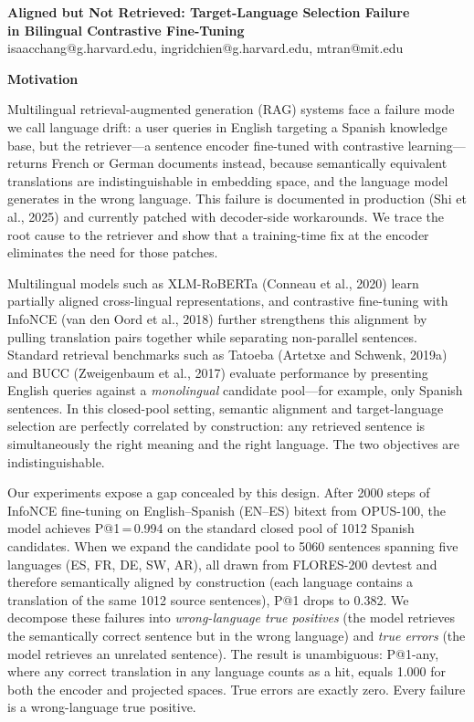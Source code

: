 \documentclass[11pt]{article}
\begin{document}
\begin{center}
{\large \textbf{Aligned but Not Retrieved: Target-Language Selection Failure\\
in Bilingual Contrastive Fine-Tuning}}\\[4pt]
isaacchang@g.harvard.edu, ingridchien@g.harvard.edu, mtran@mit.edu
\end{center}

\vspace{4pt}

\textbf{Motivation}

Multilingual retrieval-augmented generation (RAG) systems face a failure mode we call
language drift: a user queries in English targeting a Spanish knowledge base, but the
retriever---a sentence encoder fine-tuned with contrastive learning---returns French or
German documents instead, because semantically equivalent translations are
indistinguishable in embedding space, and the language model generates in the wrong
language. This failure is documented in production (Shi et al., 2025) and currently
patched with decoder-side workarounds. We trace the root cause to the retriever and
show that a training-time fix at the encoder eliminates the need for those patches.

Multilingual models such as XLM-RoBERTa (Conneau et al., 2020) learn partially aligned
cross-lingual representations, and contrastive fine-tuning with InfoNCE (van den Oord et al.,
2018) further strengthens this alignment by pulling translation pairs together while
separating non-parallel sentences. Standard retrieval benchmarks such as Tatoeba (Artetxe
and Schwenk, 2019a) and BUCC (Zweigenbaum et al., 2017) evaluate performance by presenting
English queries against a \emph{monolingual} candidate pool---for example, only Spanish
sentences. In this closed-pool setting, semantic alignment and target-language selection
are perfectly correlated by construction: any retrieved sentence is simultaneously the
right meaning and the right language. The two objectives are indistinguishable.

Our experiments expose a gap concealed by this design. After 2000 steps of InfoNCE
fine-tuning on English--Spanish (EN--ES) bitext from OPUS-100, the model achieves
P@1\,=\,0.994 on the standard closed pool of 1012 Spanish candidates. When we expand the
candidate pool to 5060 sentences spanning five languages (ES, FR, DE, SW, AR), all drawn
from FLORES-200 devtest and therefore semantically aligned by construction (each language
contains a translation of the same 1012 source sentences), P@1 drops to 0.382. We
decompose these failures into \emph{wrong-language true positives} (the model retrieves
the semantically correct sentence but in the wrong language) and \emph{true errors}
(the model retrieves an unrelated sentence). The result is unambiguous: P@1-any, where
any correct translation in any language counts as a hit, equals 1.000 for both the encoder
and projected spaces. True errors are exactly zero. Every failure is a wrong-language true
positive.
\end{document}
